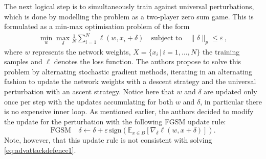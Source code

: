 The next logical step is to simultaneously train against universal perturbations, which is done by modelling the problem as a two-player zero sum game. This is formulated as a min-max optimisation problem of the form 
\begin{align} \min_w \max_{\delta} \frac1N \sum_{i = 1}^N \ell(w, x_i + \delta) \quad \text{subject to} \quad \| \delta \|_p \leq \varepsilon \, , \label{eq:advattackdefence1}
\end{align}
where $w$ represents the network weights, $X=\{x_i \, | \, i =1,\ldots,N \}$ the training samples and $\ell$ denotes the loss function. The authors propose to solve this problem by alternating stochastic gradient methods, iterating in an alternating fashion to update the network weights with a descent strategy and the universal perturbation with an ascent strategy. Notice here that $w$ and $\delta$ are updated only once per step with the updates accumulating for both $w$ and $\delta$, in particular there is no expensive inner loop. As mentioned earlier, the authors decided to modify the update for the perturbation with the following FGSM update rule:
$$\text{FGSM} \quad \delta \leftarrow \delta + \varepsilon \, \text{sign}(\mathbb{E}_{x \in B}[\nabla_{\delta} \ell(w, x + \delta)]).$$ 
Note, however, that this update rule is not consistent with solving \eqref{eq:advattackdefence1}.
